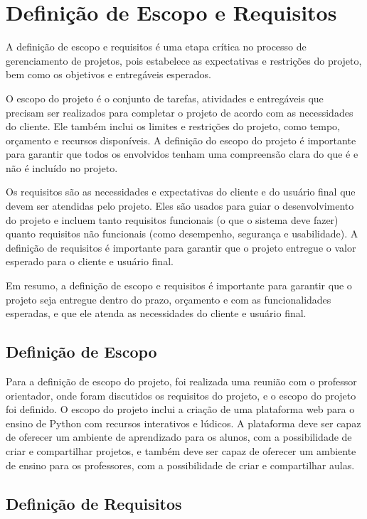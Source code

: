 \section{Definição de Escopo e Requisitos}

A definição de escopo e requisitos é uma etapa crítica no processo de gerenciamento de projetos, pois estabelece as expectativas e restrições do projeto, bem como os objetivos e entregáveis esperados. 

O escopo do projeto é o conjunto de tarefas, atividades e entregáveis que precisam ser realizados para completar o projeto de acordo com as necessidades do cliente. Ele também inclui os limites e restrições do projeto, como tempo, orçamento e recursos disponíveis. A definição do escopo do projeto é importante para garantir que todos os envolvidos tenham uma compreensão clara do que é e não é incluído no projeto. \cite{Xavier2009}

Os requisitos são as necessidades e expectativas do cliente e do usuário final que devem ser atendidas pelo projeto. Eles são usados para guiar o desenvolvimento do projeto e incluem tanto requisitos funcionais (o que o sistema deve fazer) quanto requisitos não funcionais (como desempenho, segurança e usabilidade). A definição de requisitos é importante para garantir que o projeto entregue o valor esperado para o cliente e usuário final. \cite{Machado2018} 

Em resumo, a definição de escopo e requisitos é importante para garantir que o projeto seja entregue dentro do prazo, orçamento e com as funcionalidades esperadas, e que ele atenda as necessidades do cliente e usuário final.

\subsection{Definição de Escopo}

Para a definição de escopo do projeto, foi realizada uma reunião com o professor orientador, onde foram discutidos os requisitos do projeto, e o escopo do projeto foi definido. O escopo do projeto inclui a criação de uma plataforma web para o ensino de Python com recursos interativos e lúdicos. A plataforma deve ser capaz de oferecer um ambiente de aprendizado para os alunos, com a possibilidade de criar e compartilhar projetos, e também deve ser capaz de oferecer um ambiente de ensino para os professores, com a possibilidade de criar e compartilhar aulas.

\subsection{Definição de Requisitos}

